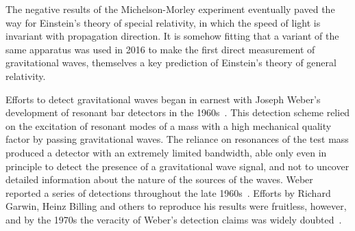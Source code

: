 The negative results of the Michelson-Morley experiment eventually paved the way for Einstein's theory of special 
relativity, in which the speed of light is invariant with propagation direction. It is somehow fitting that a variant 
of the same apparatus was used in 2016 to make the first direct measurement of gravitational waves, themselves 
a key prediction of Einstein's theory of general relativity. 


Efforts to detect gravitational waves began in earnest with Joseph Weber's development of resonant bar detectors 
in the 1960s~\cite{Weber_1968}. This detection scheme relied on the excitation of resonant modes of a mass with a high mechanical 
quality factor by passing gravitational waves. The reliance on resonances of the test mass produced a detector 
with an extremely limited bandwidth, able only even in principle to detect the presence of a gravitational wave signal, and not 
to uncover detailed information about the nature of the sources of the waves. 
Weber reported a series of detections throughout the late 1960s~\cite{Weber_1969}. Efforts by Richard Garwin, Heinz Billing and others 
to reproduce his results were fruitless, however, and by the 1970s the veracity of Weber's detection claims was widely doubted~\cite{Garwin_1973, Kafka_1978}. 

